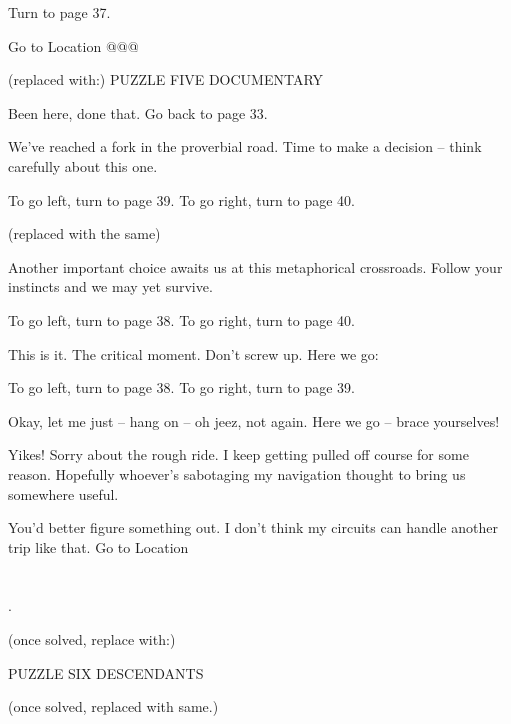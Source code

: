 \documentclass[14pt]{extbook}
\begin{document}
Turn to page 37.
\vspace*{\fill}
\newpage

\vspace*{\fill}
Go to Location @@@

(replaced with:)
PUZZLE FIVE
DOCUMENTARY

Been here, done that. Go back to page 33.

\vspace*{\fill}
\newpage

\vspace*{\fill}
We’ve reached a fork in the proverbial road. Time to make a decision -- think carefully about this one.

To go left, turn to page 39.
To go right, turn to page 40.

(replaced with the same)
\vspace*{\fill}
\newpage

\vspace*{\fill}
Another important choice awaits us at this metaphorical crossroads. Follow your instincts and we may yet survive.

To go left, turn to page 38.
To go right, turn to page 40.
\vspace*{\fill}
\newpage

\vspace*{\fill}
This is it. The critical moment. Don’t screw up. Here we go:

To go left, turn to page 38.
To go right, turn to page 39.
\vspace*{\fill}
\newpage

\vspace*{\fill}
Okay, let me just -- hang on -- oh jeez, not again. Here we go -- brace yourselves!

Yikes! Sorry about the rough ride. I keep getting pulled off course for some reason. Hopefully whoever’s sabotaging my navigation thought to bring us somewhere useful.

You’d better figure something out. I don’t think my circuits can handle another trip like that. Go to Location \\\\\\ .


(once solved, replace with:)

PUZZLE SIX
DESCENDANTS
\vspace*{\fill}
\newpage

\vspace*{\fill}
(once solved, replaced with same.)
\vspace*{\fill}
\newpage
\end{document}
